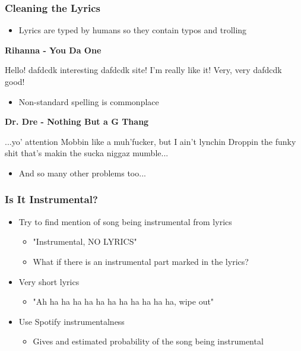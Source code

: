 \documentclass[10pt]{beamer}
\begin{document}
\begin{frame}
\frametitle{Cleaning the Lyrics}

\begin{itemize}
    \item Lyrics are typed by humans so they contain typos and trolling
\end{itemize}

\medskip

\textbf{Rihanna - You Da One}

Hello! dafdcdk interesting dafdcdk site! I'm really like it! Very, very dafdcdk good!

\bigskip

\begin{itemize}
    \item Non-standard spelling is commonplace
\end{itemize}

\medskip

\textbf{Dr. Dre - Nothing But a G Thang}

...yo' attention Mobbin like a muh'fucker, but I ain't lynchin Droppin the funky shit that's makin the sucka niggaz mumble...

\bigskip

\begin{itemize}
    \item And so many other problems too...
\end{itemize}


\end{frame}

\begin{frame}
\frametitle{Is It Instrumental?}

\begin{itemize}
    \item Try to find mention of song being instrumental from lyrics
        \begin{itemize}
            \item "Instrumental, NO LYRICS"
            \item What if there is an instrumental part marked in the lyrics?
        \end{itemize}
    \item Very short lyrics
    \begin{itemize}
        \item "Ah ha ha ha ha ha ha ha ha ha ha ha, wipe out"
    \end{itemize}
    \item Use Spotify instrumentalness
    \begin{itemize}
        \item Gives and estimated probability of the song being instrumental
    \end{itemize}
\end{itemize}


\end{frame}
\end{document}
